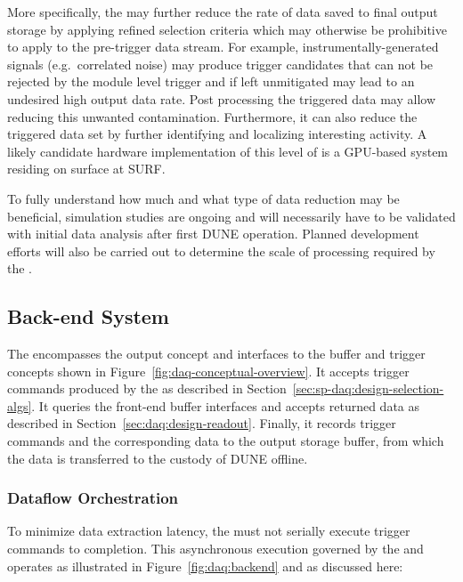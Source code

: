 More specifically, the  may further reduce the rate of data saved to final output storage by
applying refined selection criteria which may otherwise be prohibitive
to apply to the pre-trigger data stream.  For example, instrumentally-generated signals (e.g.~correlated noise)
may produce trigger candidates that can not be rejected by the module
level trigger and if left unmitigated may lead to an undesired high
output data rate. 
Post processing the triggered data may allow reducing this unwanted
contamination.
Furthermore, it can also reduce the triggered data set by further identifying
and localizing interesting activity. A likely candidate hardware
implementation of this level of  is a GPU-based system
residing on surface at SURF.

To fully understand how much and what type of data reduction may be
beneficial, simulation studies are ongoing  and will
necessarily have to be
validated with initial data analysis after
first DUNE  operation. Planned 
development efforts will also be carried out to determine the scale of
processing required by the .


\subsection{Back-end System}
\label{sec:fd-daq:design-backend}

The  encompasses the output concept and interfaces to the buffer and trigger concepts shown in Figure~\ref{fig:daq-conceptual-overview}. 
It accepts trigger commands produced by the  as described in Section~\ref{sec:sp-daq:design-selection-algs}. 
It queries the front-end buffer interfaces and accepts returned data as described in Section~\ref{sec:daq:design-readout}. 
Finally, it records trigger commands and the corresponding data to the output storage buffer, from which the data is transferred to the custody of DUNE offline.

\subsubsection{Dataflow Orchestration}

To minimize data extraction latency, the  must not serially execute trigger commands to completion. 
This asynchronous execution governed by the  and operates as illustrated in Figure~\ref{fig:daq:backend} and as discussed here:

